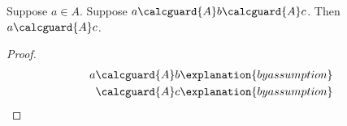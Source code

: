 

\begin{proposition}\label{calculation_missing_condition}
    Suppose $a\in A$.
    Suppose $a\calcguard{A}b\calcguard{A}c$.
    Then $a\calcguard{A}c$.
\end{proposition}
\begin{proof}
    \begin{align*} a &\calcguard{A}b \explanation{by assumption} \\ &\calcguard{A}c \explanation{by assumption} \end{align*}
\end{proof}
